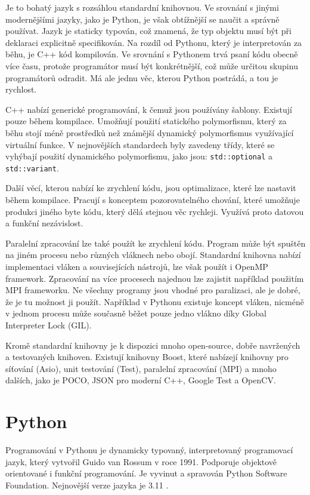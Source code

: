 Je to bohatý jazyk s rozsáhlou standardní knihovnou.
Ve srovnání s jinými modernějšími jazyky, jako je Python, je však obtížnější se naučit a správně používat.
Jazyk je staticky typován, což znamená, že typ objektu musí být při deklaraci explicitně specifikován.
Na rozdíl od Pythonu, který je interpretován za běhu, je C++ kód kompilován.
Ve srovnání s Pythonem trvá psaní kódu obecně více času, protože programátor musí být konkrétnější, což může určitou skupinu programátorů odradit.
Má ale jednu věc, kterou Python postrádá, a tou je rychlost.

C++ nabízí generické programování, k čemuž jsou používány šablony.
Existují pouze během kompilace.
Umožňují použití statického polymorfismu, který za běhu stojí méně prostředků než známější dynamický polymorfismus využívající virtuální funkce.
V nejnovějších standardech byly zavedeny třídy, které se vyhýbají použití dynamického polymorfismu, jako jsou: \texttt{std::optional} a \texttt{std::variant}.

Další věcí, kterou nabízí ke zrychlení kódu, jsou optimalizace, které lze nastavit během kompilace.
Pracují s konceptem pozorovatelného chování, které umožňuje produkci jiného byte kódu, který dělá stejnou věc rychleji.
Využívá proto datovou a funkční nezávislost.

Paralelní zpracování lze také použít ke zrychlení kódu.
Program může být spuštěn na jiném procesu nebo různých vláknech nebo obojí.
Standardní knihovna nabízí implementaci vláken a souvisejících nástrojů, lze však použít i OpenMP framework.
Zpracování na více procesech najednou lze zajistit například použitím MPI frameworku.
Ne všechny programy jsou vhodné pro paralizaci, ale je dobré, že je tu možnost ji použít.
Například v Pythonu existuje koncept vláken, nicméně v jednom procesu může současně běžet pouze jedno vlákno díky Global Interpreter Lock (GIL).

Kromě standardní knihovny je k dispozici mnoho open-source, dobře navržených a testovaných knihoven.
Existují knihovny Boost, které nabízejí knihovny pro síťování (Asio), unit testování (Test), paralelní zpracování (MPI) a mnoho dalších, jako je POCO, JSON pro moderní C++, Google Test a OpenCV.

\section{Python}
Programování v Pythonu je dynamicky typovaný, interpretovaný programovací jazyk, který vytvořil Guido van Rossum v roce 1991.
Podporuje objektově orientované i funkční programování.
Je vyvinut a spravován Python Software Foundation.
Nejnovější verze jazyka je 3.11 \cite{python}.

